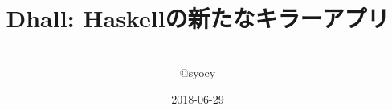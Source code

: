\documentclass[unicode,12pt]{beamer}
\title{Dhall: Haskellの新たなキラーアプリ}
\author[@syocy]{
    \frame{\texttt{[image: icon.jpg]}}\\%
    \vspace{0.5em}%
    @syocy%
}
\date{2018-06-29}
\begin{document}
\begin{frame}[plain]\frametitle{}
  \titlepage
\end{frame}
\end{document}
